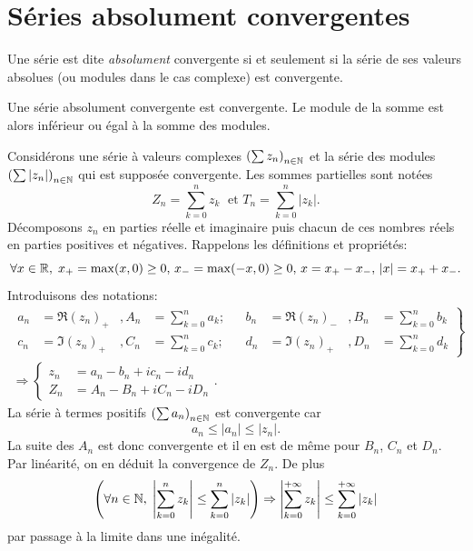\clearpage
\section{Séries absolument convergentes}
\begin{defi}
  Une série est dite \emph{absolument} convergente si et seulement si la série de ses valeurs absolues (ou modules dans le cas complexe) est convergente.
\end{defi}
\begin{prop}
  Une série absolument convergente est convergente. Le module de la somme est alors inférieur ou égal à la somme des modules.
\end{prop}
\begin{demo}
Considérons une série à valeurs complexes $\left( \sum z_n\right)_{n \in \mathbb{N}}$ et la série des modules $\left( \sum |z_n|\right)_{n \in \mathbb{N}}$ qui est supposée convergente. Les sommes partielles sont notées
\[
 Z_n = \sum_{k=0}^n z_k\; \text{ et } T_n = \sum_{k=0}^n |z_k|.
\]
Décomposons $z_n$ en parties réelle et imaginaire puis chacun de ces nombres réels en parties positives et négatives. Rappelons les définitions et propriétés:
\[
 \forall x \in \mathbb{R},\; x_+ = \max(x,0)\geq 0, \, x_- = \max(-x,0) \geq 0,\, x = x_+ - x_-,\, |x| = x_+ + x_-.  
\]
Introduisons des notations:
\begin{multline*}
\left. 
\begin{aligned}
 a_n &= \Re(z_n)_+ &, A_n &= \sum_{k=0}^n a_k ; & &
 b_n &= \Re(z_n)_- &, B_n &= \sum_{k=0}^n b_k \\
 c_n &= \Im(z_n)_+ &, C_n &= \sum_{k=0}^n c_k ; & &
 d_n &= \Im(z_n)_+ &, D_n &= \sum_{k=0}^n d_k 
\end{aligned}
\right\rbrace \\
\Rightarrow 
\left\lbrace 
\begin{aligned}
z_n &= a_n - b_n + ic_n -id_n \\
Z_n &= A_n - B_n + iC_n -iD_n
\end{aligned}
\right. .
\end{multline*}
La série à termes positifs $\left( \sum a_n\right)_{n \in \mathbb{N}}$ est convergente car 
\[
 a_n \leq |a_n| \leq |z_n| .
\]
La suite des $A_n$ est donc convergente et il en est de même pour $B_n$, $C_n$ et $D_n$. Par linéarité, on en déduit la convergence de $Z_n$.\newline
De plus
\[
 \left( \forall n \in \mathbb{N}, \; \left| \sum_{k=0}^{n} z_k \right| \leq \sum_{k=0}^{n} |z_k|\right)  
 \Rightarrow 
 \left| \sum_{k=0}^{+\infty} z_k \right| \leq \sum_{k=0}^{+\infty} |z_k|
\]
par passage à la limite dans une inégalité.
\end{demo}
